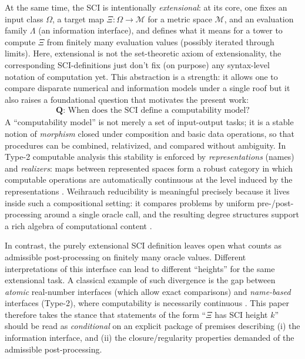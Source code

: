 \documentclass{lmcs} %
\theoremstyle{plain}
\theoremstyle{plain}
\theoremstyle{definition}
\theoremstyle{remark}
\theoremstyle{definition}
\theoremstyle{remark}
\numberwithin{equation}{section}
\begin{document}
At the same time, the SCI is intentionally \textit{extensional}: at its core, one fixes an input
class $\Omega$, a target map $\Xi:\Omega\to \mathcal{M}$ for a metric space $\mathcal{M}$, and an evaluation family $\Lambda$ (an
information interface), and defines what it means for a tower to compute $\Xi$ from finitely
many evaluation values (possibly iterated through limits). Here, extensional is not the set-theoretic axiom of extensionality,
the corresponding SCI-definitions just don't fix (on purpose) any syntax-level notation of computation yet.
This abstraction is a strength: it allows one to compare disparate numerical and information
models under a single roof but it also raises a foundational question that motivates the
present work:
\begin{align*}
\textbf{Q:} \text{ When does the SCI define a computability model?}
\end{align*}
A \enquote{computability model} is not merely a set of input-output tasks; it is a stable notion of
\textit{morphism} closed under composition and basic data operations, so that procedures can be
combined, relativized, and compared without ambiguity.
In Type-2 computable analysis this stability is enforced by \textit{representations} (names) and
\textit{realizers}: maps between represented spaces form a robust category in which computable
operations are automatically continuous at the level induced by the representations
\cite{weihrauch2000computable,brattka2021weihrauch}.
Weihrauch reducibility is meaningful precisely because it lives inside such a compositional
setting: it compares problems by uniform pre-/post-processing around a single oracle call,
and the resulting degree structures support a rich algebra of computational content
\cite{brattka2011weihrauch,brattka2021weihrauch}.

In contrast, the purely extensional SCI definition leaves open what counts as admissible
post-processing on finitely many oracle values.
Different interpretations of this interface can lead to different \enquote{heights} for the
same extensional task.
A classical example of such divergence is the gap between \textit{atomic} real-number interfaces
(which allow exact comparisons) and \textit{name-based} interfaces (Type-2), where computability
is necessarily continuous \cite{weihrauch2000computable,neumann2018topological,BSS98}.
This paper therefore takes the stance that statements of the form \enquote{$\Xi$ has SCI height $k$} 
should be read as \textit{conditional} on an explicit package of premises describing 
(i) the information interface, and (ii) the closure/regularity properties
demanded of the admissible post-processing.
\end{document}
